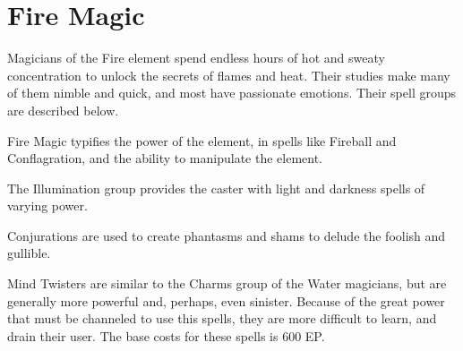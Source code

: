 \chapter{Fire Magic}
\label{ch:elemental-fire-magic}

Magicians of the Fire element spend endless hours of hot and sweaty concentration to unlock the secrets of flames and heat. Their studies make many of them nimble and quick, and most have passionate emotions. Their spell groups are described below.

Fire Magic typifies the power of the element, in spells like Fireball and Conflagration, and the ability to manipulate the element.

The Illumination group provides the caster with light and darkness spells of varying power.

Conjurations are used to create phantasms and shams to delude the foolish and gullible.

Mind Twisters are similar to the Charms group of the Water magicians, but are generally more powerful and, perhaps, even sinister. Because of the great power that must be channeled to use this spells, they are more difficult to learn, and drain their user. The base costs for these spells is 600 EP. 

